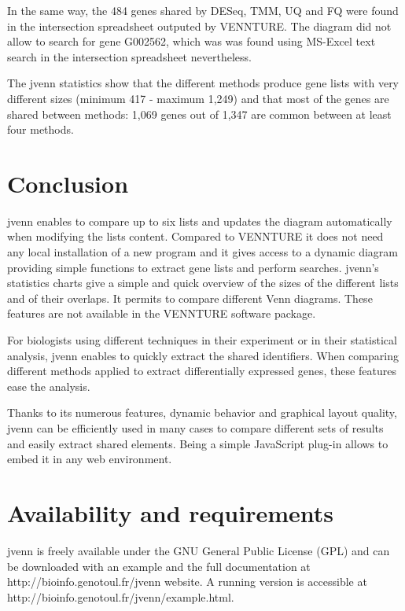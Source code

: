 \documentclass{bmcart}
\begin{document}
In the same way, the 484 genes shared by DESeq, TMM, UQ and FQ  were found
in the intersection spreadsheet outputed by VENNTURE. The diagram did not allow
to search for gene G002562, which was was found using MS-Excel text search in
the intersection spreadsheet nevertheless.

The jvenn statistics show that the different methods produce gene lists with
very different sizes (minimum 417 - maximum 1,249) and that most of the genes are
shared between methods: 1,069 genes out of 1,347 are common between at least 
four methods.

\section*{Conclusion}

jvenn enables to compare up to six lists and updates the diagram automatically
when modifying the lists content. Compared to VENNTURE it does not need any 
local installation of a new program and it gives access to a dynamic diagram 
providing simple functions to extract gene lists and perform searches. 
jvenn's statistics charts give a simple and quick overview of the sizes of the
different lists and of their overlaps. It permits to compare different Venn
diagrams. These features are not available in the VENNTURE software package.

For biologists using different techniques in their experiment or in their
statistical analysis, jvenn enables to quickly extract the shared identifiers.
When comparing different methods applied to extract differentially expressed
genes, these features ease the analysis.

Thanks to its numerous features, dynamic behavior and graphical layout quality,
jvenn can be efficiently used in many cases to compare different sets of results
and easily extract shared elements. Being a simple JavaScript plug-in allows to
embed it in any web environment.


\section*{Availability and requirements}

jvenn is freely available under the GNU General Public License (GPL) and can be
downloaded with an example and the full documentation at
http://bioinfo.genotoul.fr/jvenn  website. A running version is accessible at
http://bioinfo.genotoul.fr/jvenn/example.html.

\end{document}
